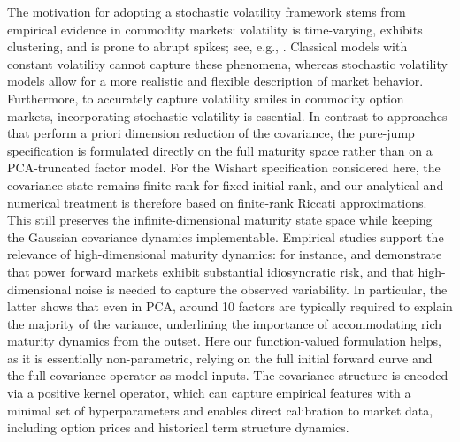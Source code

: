 \documentclass[10pt,a4paper,reqno]{amsart}
\numberwithin{equation}{section}
\theoremstyle{plain}
\theoremstyle{definition}
\theoremstyle{example}
\begin{document}
The motivation for adopting a stochastic volatility framework stems from empirical evidence in commodity markets: volatility is time-varying, exhibits clustering, and is prone to abrupt spikes; see, e.g., \cite{eydeland2002energy, benth2012modeling}. Classical models with constant volatility cannot capture these phenomena, whereas stochastic volatility models allow for a more realistic and flexible description of market behavior. Furthermore, to accurately capture volatility smiles in commodity option markets, incorporating stochastic volatility is essential. In contrast to approaches that perform a priori dimension reduction of the covariance, the pure-jump specification is formulated directly on the full maturity space rather than on a PCA-truncated factor model. For the Wishart specification considered here, the covariance state remains finite rank for fixed initial rank, and our analytical and numerical treatment is therefore based on finite-rank Riccati approximations. This still preserves the infinite-dimensional maturity state space while keeping the Gaussian covariance dynamics implementable. Empirical studies support the relevance of high-dimensional maturity dynamics: for instance, \cite{andresen2010modeling} and \cite{koekebakker2005forward} demonstrate that power forward markets exhibit substantial idiosyncratic risk, and that high-dimensional noise is needed to capture the observed variability. In particular, the latter shows that even in PCA, around 10 factors are typically required to explain the majority of the variance, underlining the importance of accommodating rich maturity dynamics from the outset. Here our function-valued formulation helps, as it is essentially non-parametric, relying on the full initial forward curve and the full covariance operator as model inputs. The covariance structure is encoded via a positive kernel operator, which can capture empirical features with a minimal set of hyperparameters and enables direct calibration to market data, including option prices and historical term structure dynamics.
\end{document}
